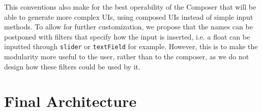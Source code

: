 This conventions also make for the best operability of the Composer that will be able to generate more complex UIs, using composed UIs instead of simple input methods. To allow for further customization, we propose that the names can be postponed with filters that specify how the input is inserted, i.e. a float can be inputted through \verb|slider| or \verb|textField| for example. However, this is to make the modularity more useful to the user, rather than to the composer, as we do not design how these filters could be used by it.


\section{Final Architecture}

